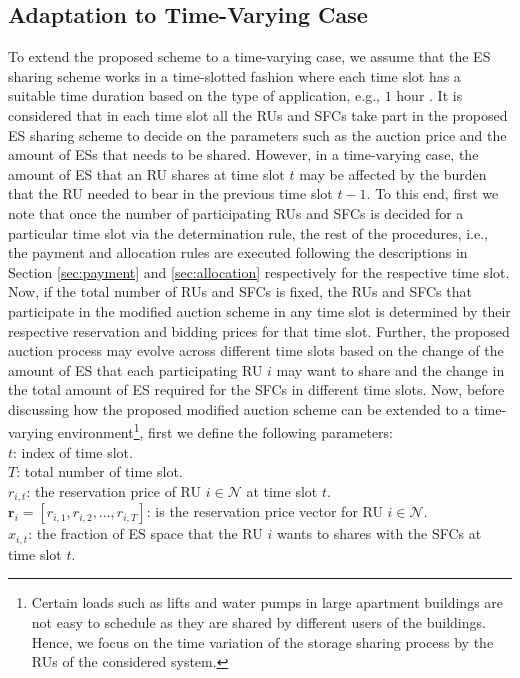 \documentclass[journal,10pt]{IEEEtran}
\begin{document}
\subsection{Adaptation to Time-Varying Case}\label{sec:time-varying}
To extend the proposed scheme to a time-varying case, we assume that the ES sharing scheme works in a time-slotted fashion where each time slot has a suitable time duration based on the type of application, e.g., $1$ hour \cite{Derin:2010}. It is considered that in each time slot all the RUs and SFCs take part in the proposed ES sharing scheme to decide on the parameters such as the auction price and the amount of ESs that needs to be shared. However, in a time-varying case, the amount of ES that an RU shares at time slot $t$ may be affected by the burden that the RU needed to bear in the previous time slot $t-1$. To this end, first we note that once the number of participating RUs and SFCs is decided for a particular time slot via the determination rule, the rest of the procedures, i.e., the payment and allocation rules are executed following the descriptions in Section \ref{sec:payment} and \ref{sec:allocation} respectively for the respective time slot. Now, if the total number of RUs and SFCs is fixed, the RUs and SFCs that participate in the modified auction scheme in any time slot is determined by their respective reservation and bidding prices for that time slot. Further, the proposed auction process may evolve across different time slots based on the change of the amount of ES that each participating RU $i$ may want to share and the change in the total amount of ES required for the SFCs in different time slots. Now, before discussing how the proposed modified auction scheme can be extended to a time-varying environment\footnote{Certain loads such as lifts and water pumps in large apartment buildings are not easy to schedule as they are shared by different users of the buildings. Hence, we focus on the time variation of the storage sharing process by the RUs of the considered system.}, first we define the following parameters:\\
$t$: index of time slot.\\
$T$: total number of time slot.\\
$r_{i,t}$: the reservation price of RU $i\in\mathcal{N}$ at time slot $t$.\\
$\mathbf{r}_i = [r_{i,1}, r_{i,2}, \hdots, r_{i,T}]$: is the reservation price vector for RU $i\in\mathcal{N}$.\\
$x_{i,t}$: the fraction of ES space that the RU $i$ wants to shares with the SFCs at time slot $t$.\\
\end{document}
